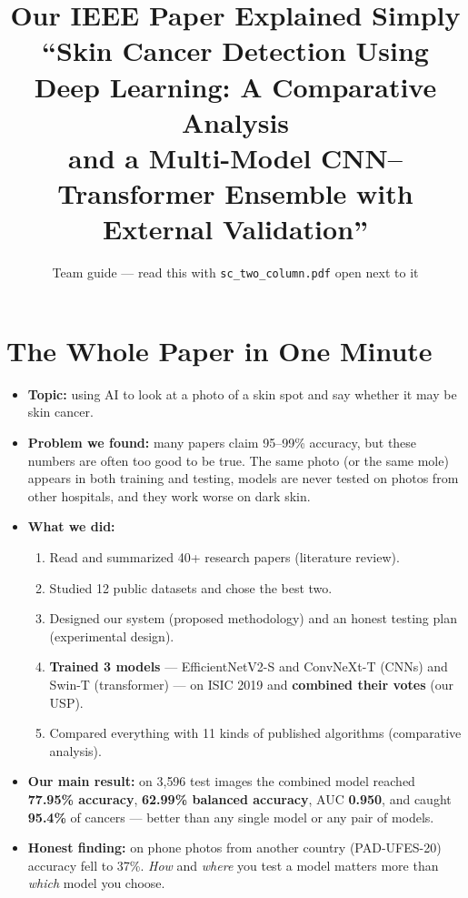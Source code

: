 \documentclass[11pt,a4paper]{article}
\title{\color{hcBlue}\bfseries Our IEEE Paper Explained Simply\\[4pt]
\large ``Skin Cancer Detection Using Deep Learning: A Comparative Analysis\\
and a Multi-Model CNN--Transformer Ensemble with External Validation''}
\author{Team guide --- read this with \texttt{sc\_two\_column.pdf} open next to it}
\date{}
\begin{document}
\maketitle
\vspace{-6mm}
\tableofcontents
\newpage

\section{The Whole Paper in One Minute}
\begin{itemize}
  \item \textbf{Topic:} using AI to look at a photo of a skin spot and
        say whether it may be skin cancer.
  \item \textbf{Problem we found:} many papers claim 95--99\% accuracy,
        but these numbers are often too good to be true. The same photo
        (or the same mole) appears in both training and testing, models
        are never tested on photos from other hospitals, and they work
        worse on dark skin.
  \item \textbf{What we did:}
  \begin{enumerate}
    \item Read and summarized 40+ research papers (literature review).
    \item Studied 12 public datasets and chose the best two.
    \item Designed our system (proposed methodology) and an honest
          testing plan (experimental design).
    \item \textbf{Trained 3 models} --- EfficientNetV2-S and ConvNeXt-T
          (CNNs) and Swin-T (transformer) --- on ISIC 2019 and
          \textbf{combined their votes} (our USP).
    \item Compared everything with 11 kinds of published algorithms
          (comparative analysis).
  \end{enumerate}
  \item \textbf{Our main result:} on 3{,}596 test images the combined model
        reached \textbf{77.95\% accuracy}, \textbf{62.99\% balanced accuracy},
        AUC \textbf{0.950}, and caught \textbf{95.4\%} of cancers --- better
        than any single model or any pair of models.
  \item \textbf{Honest finding:} on phone photos from another country
        (PAD-UFES-20) accuracy fell to 37\%. \emph{How} and \emph{where} you
        test a model matters more than \emph{which} model you choose.
\end{itemize}
\end{document}
